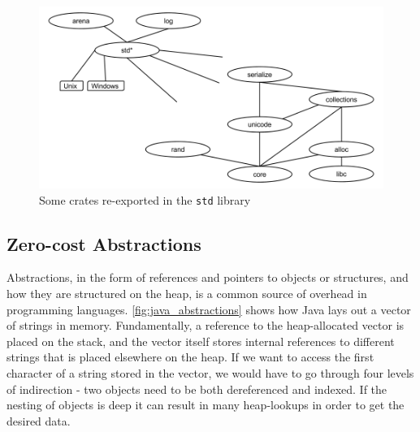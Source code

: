 \begin{figure}[H]
  \begin{center}
    \includegraphics[scale=0.3]{figures/background/rust/rust-lib.png}
  \end{center}
  \caption{Some crates re-exported in the \texttt{std} library}
  \label{fig:rust:librust}
\end{figure}

\subsection{Zero-cost Abstractions}
\label{chap:zero_cost_abstractions}

Abstractions, in the form of references and pointers to objects or structures, and how they are
structured on the heap, is a common source of overhead in programming languages.
\autoref{fig:java_abstractions}  shows how Java lays out a vector of
strings in memory.
Fundamentally, a reference to the heap-allocated vector is placed on the stack, and the vector itself stores internal references to different strings that is placed elsewhere on the heap.
If we want to access the first character of a string stored in the vector, we would have to go through four levels of indirection - two objects need to be both dereferenced and indexed.
If the nesting of objects is deep it can result in many heap-lookups in order to get the desired data.

